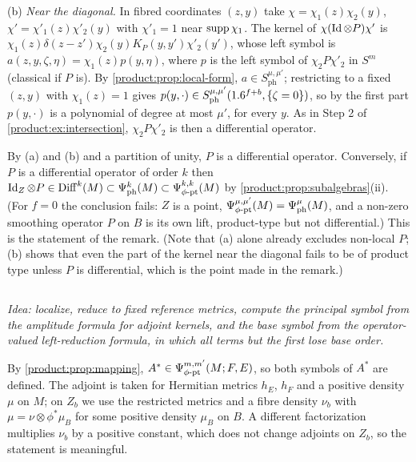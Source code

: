 (b) \emph{Near the diagonal.} In fibred coordinates $(z,y)$ take
$\chi=\chi_1(z)\chi_2(y)$, $\chi'=\chi'_1(z)\chi'_2(y)$ with $\chi'_1=1$ near
$\operatorname{supp}\chi_1$. The kernel of $\chi(\operatorname{Id}\otimes P)\chi'$ is
$\chi_1(z)\delta(z-z')\chi_2(y)K_P(y,y')\chi'_2(y')$, whose left symbol is
$a(z,y,\zeta,\eta)=\chi_1(z)p(y,\eta)$, where $p$ is the left symbol of
$\chi_2P\chi'_2$ in $S^m$ (classical if $P$ is). By \cref{product:prop:local-form},
$a\in S^{\mu,\mu'}_{\mathrm{ph}}$; restricting to a fixed $(z,y)$ with $\chi_1(z)=1$
gives $p(y,\cdot)\in S^{\mu,\mu'}_{\mathrm{ph}}(1.6^{f+b},\{\zeta=0\})$, so by the first
part $p(y,\cdot)$ is a polynomial of degree at most $\mu'$, for every $y$. As in
Step 2 of \cref{product:ex:intersection}, $\chi_2P\chi'_2$ is then a differential
operator.

By (a) and (b) and a partition of unity, $P$ is a differential operator. Conversely,
if $P$ is a differential operator of order $k$ then $\operatorname{Id}_Z\otimes P\in\operatorname{Diff}^{k}(M)\subset\Psi^{k}_{\mathrm{ph}}(M)\subset\Psi^{k,k}_{\phi\text{-}\mathrm{pt}}(M)$ by
\cref{product:prop:subalgebras}(ii). (For $f=0$ the conclusion fails: $Z$ is a
point, $\Psi^{\mu,\mu'}_{\phi\text{-}\mathrm{pt}}(M)=\Psi^{\mu}_{\mathrm{ph}}(M)$, and a non-zero smoothing
operator $P$ on $B$ is its own lift, product-type but not differential.)
This is the statement of the remark. (Note that (a) alone already excludes
non-local $P$; (b) shows that even the part of the kernel near the diagonal fails to
be of product type unless $P$ is differential, which is the point made in the remark.)

\subsection*{}
\emph{Idea: localize, reduce to fixed reference metrics, compute the principal
symbol from the amplitude formula for adjoint kernels, and the base symbol from the
operator-valued left-reduction formula, in which all terms but the first lose base
order.}

By \cref{product:prop:mapping}, $A^*\in\Psi^{m,m'}_{\phi\text{-}\mathrm{pt}}(M;F,E)$, so both symbols of
$A^*$ are defined. The adjoint is taken for Hermitian metrics $h_E$, $h_F$ and a
positive density $\mu$ on $M$; on $Z_b$ we use the restricted metrics and a fibre
density $\nu_b$ with $\mu=\nu\otimes\phi^*\mu_B$ for some positive density $\mu_B$ on
$B$. A different factorization multiplies $\nu_b$ by a positive constant, which does
not change adjoints on $Z_b$, so the statement is meaningful.

